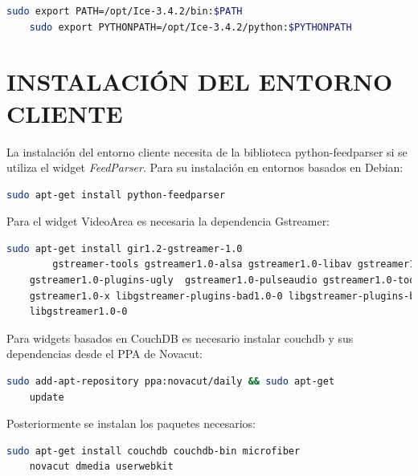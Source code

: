     \begin{lstlisting}[language={bash}, texcl=false, caption={Configuración
    path}] sudo export PATH=/opt/Ice-3.4.2/bin:$PATH
    sudo export PYTHONPATH=/opt/Ice-3.4.2/python:$PYTHONPATH
    \end{lstlisting}

    \newpage
    
    \section{\uppercase{Instalación del entorno cliente}}
    
    La instalación del entorno cliente necesita de la biblioteca
    python-feedparser si se utiliza el widget \emph{FeedParser}. Para su
    instalación en entornos basados en Debian:
    
    \begin{lstlisting}[language={bash}, texcl=false, caption={Instalación
        python-feedparser}] sudo apt-get install python-feedparser
    \end{lstlisting}
    
    Para el widget VideoArea es necesaria la dependencia Gstreamer:
    \begin{lstlisting}[language={bash}, texcl=false, caption={Instalación
        dependencias Gstreamer}] sudo apt-get install gir1.2-gstreamer-1.0
        gstreamer-tools gstreamer1.0-alsa gstreamer1.0-libav gstreamer1.0-plugins-bad gstreamer1.0-plugins-base gstreamer1.0-plugins-good
    gstreamer1.0-plugins-ugly  gstreamer1.0-pulseaudio gstreamer1.0-tools
    gstreamer1.0-x libgstreamer-plugins-bad1.0-0 libgstreamer-plugins-base1.0-0
    libgstreamer1.0-0
    \end{lstlisting}
    
    Para widgets basados en CouchDB es necesario instalar couchdb y sus
    dependencias desde el PPA de Novacut:
    
    \begin{lstlisting}[language={bash}, texcl=false, caption={Añadir PPA daily
    Novacut}] sudo add-apt-repository ppa:novacut/daily && sudo apt-get
    update
    \end{lstlisting}
    
    Posteriormente se instalan los paquetes necesarios:
    
    \begin{lstlisting}[language={bash}, texcl=false, caption={Instalar paquetes
    del PPA de Novacut}] sudo apt-get install couchdb couchdb-bin microfiber
    novacut dmedia userwebkit
    \end{lstlisting}

